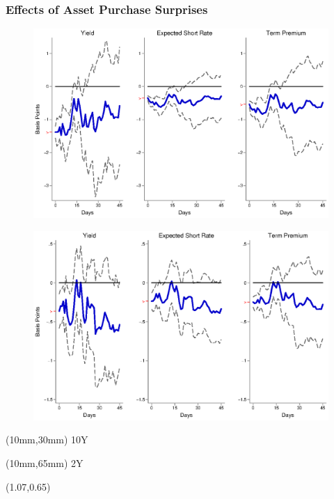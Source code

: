 \documentclass[12pt, aspectratio=169, xcolor=dvipsnames]{beamer}
\begin{document}
\begin{frame}[label=LSAPUS]
\frametitle{Effects of Asset Purchase Surprises}
\begin{figure}[!htbp]
\begin{center} %
\includegraphics[trim={0cm 0cm 0cm 0cm},clip,height=0.45\textheight,width=0.85\linewidth]{../Figures/LPs/LagDep-FX/LSAP/US/DCMP/LSAPUSDnomyptp120m.eps}
\par\end{center}
\end{figure}
\vspace{-0.5cm}
\begin{figure}[!htbp]
\begin{center} %
\includegraphics[trim={0cm 0cm 0cm 0.76cm},clip,height=0.45\textheight,width=0.85\linewidth]{../Figures/LPs/LagDep-FX/LSAP/US/DCMP/LSAPUSDnomyptp24m.eps}
\par\end{center}
\end{figure}
\begin{textblock*}{8mm}(10mm,30mm)
\small 10Y
\end{textblock*}
\begin{textblock*}{8mm}(10mm,65mm)
\small 2Y
\end{textblock*}
\begin{textblock*}{5cm}(1.07\textwidth,0.65\textheight)
\hyperlink{LSAPEM}{}
\end{textblock*}
\end{frame}
\end{document}
